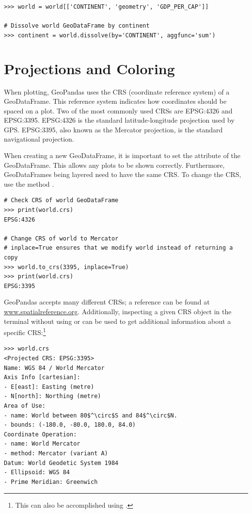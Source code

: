 \begin{lstlisting}
>>> world = world[['CONTINENT', 'geometry', 'GDP_PER_CAP']]

# Dissolve world GeoDataFrame by continent
>>> continent = world.dissolve(by='CONTINENT', aggfunc='sum')
\end{lstlisting}


\section*{Projections and Coloring} %

When plotting, GeoPandas uses the CRS (coordinate reference system) of a GeoDataFrame.
This reference system indicates how coordinates should be spaced on a plot.
Two of the most commonly used CRSs are EPSG:4326 and EPSG:3395.
EPSG:4326 is the standard latitude-longitude projection used by GPS.
EPSG:3395, also known as the Mercator projection, is the standard navigational projection.

When creating a new GeoDataFrame, it is important to set the  attribute of the GeoDataFrame.
This allows any plots to be shown correctly.
Furthermore, GeoDataFrames being layered need to have the same CRS.
To change the CRS, use the method .

\begin{lstlisting}
# Check CRS of world GeoDataFrame
>>> print(world.crs)
EPSG:4326

# Change CRS of world to Mercator
# inplace=True ensures that we modify world instead of returning a copy
>>> world.to_crs(3395, inplace=True)
>>> print(world.crs)
EPSG:3395
\end{lstlisting}

GeoPandas accepts many different CRSs; a reference can be found at \url{www.spatialreference.org}.
Additionally, inspecting a given CRS object in the terminal without using  or  can be used to get additional information about a specific CRS:\footnote{This can also be accomplished using .}
\begin{lstlisting}[mathescape]
>>> world.crs
<Projected CRS: EPSG:3395>
Name: WGS 84 / World Mercator
Axis Info [cartesian]:
- E[east]: Easting (metre)
- N[north]: Northing (metre)
Area of Use:
- name: World between 80$^\circ$S and 84$^\circ$N.
- bounds: (-180.0, -80.0, 180.0, 84.0)
Coordinate Operation:
- name: World Mercator
- method: Mercator (variant A)
Datum: World Geodetic System 1984
- Ellipsoid: WGS 84
- Prime Meridian: Greenwich
\end{lstlisting}

